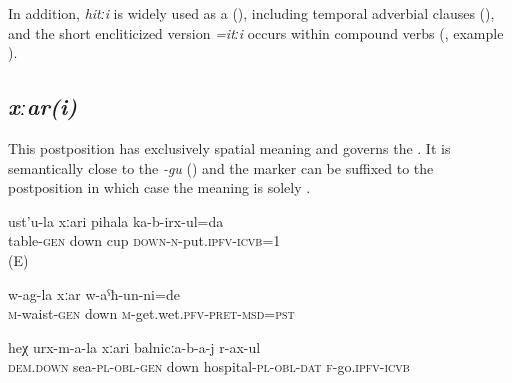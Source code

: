 In addition, \textit{hitːi} is widely used as a  (), including temporal adverbial clauses (), and the short encliticized version \textit{=itːi} occurs within compound verbs (, example ).



\subsection{\textit{xːar(i)} }
\label{ssec:postposition xari}

This postposition has exclusively spatial meaning  and governs the  . It is semantically close to the  \textit{-gu} () and the  marker can be suffixed to the postposition in which case the meaning is solely .

\begin{exe}
	\ex
	\begin{xlist}
		\ex	\label{I put the cup under the table / to the bottom of the table}
		\gll	ust'u-la	xːari	pihala	ka-b-irx-ul=da  \\
			table-\textsc{gen}	down	cup	\textsc{down-n}-put.\textsc{ipfv}-\textsc{icvb}=1\\
		\glt	{} (E)

		\ex	\label{From the waist down I was wet}
		\gll	 w-ag-la	xːar	w-aˁħ-un-ni=de \\
			\textsc{m}-waist-\textsc{gen}	down	\textsc{m}-get.wet.\textsc{pfv}-\textsc{pret}-\textsc{msd}=\textsc{pst}\\
		\glt	{}

		\ex	\label{I went to the hospital down at the sea}
		\gll	heχ	urx-m-a-la	xːari	balnicːa-b-a-j	r-ax-ul\\
			\textsc{dem.down}	sea-\textsc{pl}-\textsc{obl}-\textsc{gen}	down	hospital-\textsc{pl}-\textsc{obl}-\textsc{dat}	\textsc{f}-go.\textsc{ipfv}-\textsc{icvb}\\
		\glt	{}
	\end{xlist}
\end{exe}


